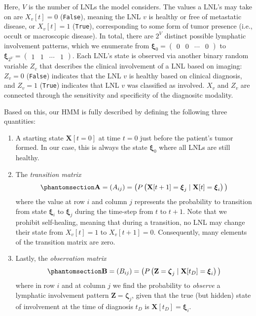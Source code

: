 \documentclass[
  sn-mathphys-num,
]{sn-jnl}
\providecommand{\tightlist}{%
  \setlength{\itemsep}{0pt}\setlength{\parskip}{0pt}}\usepackage{longtable,booktabs,array}
\begin{document}
Here, \(V\) is the number of LNLs the model considers. The values a
LNL's may take on are \(X_v[t] = 0\) (\texttt{False}), meaning the LNL
\(v\) is healthy or free of metastatic disease, or \(X_v[t] = 1\)
(\texttt{True}), corresponding to some form of tumor presence (i.e.,
occult or macroscopic disease). In total, there are \(2^V\) distinct
possible lymphatic involvement patterns, which we enumerate from
\(\boldsymbol{\xi}_0 = \begin{pmatrix} 0 & 0 & \cdots & 0 \end{pmatrix}\)
to
\(\boldsymbol{\xi}_{2^V} = \begin{pmatrix} 1 & 1 & \cdots & 1 \end{pmatrix}\).
Each LNL's state is observed via another binary random variable \(Z_v\)
that describes the clinical involvement of a LNL based on imaging:
\(Z_v = 0\) (\texttt{False}) indicates that the LNL \(v\) is healthy
based on clinical diagnosis, and \(Z_v = 1\) (\texttt{True}) indicates
that LNL \(v\) was classified as involved. \(X_v\) and \(Z_v\) are
connected through the sensitivity and specificity of the diagnositc
modality.

Based on this, our HMM is fully described by defining the following
three quantities:

\begin{enumerate}
\def\labelenumi{\arabic{enumi}.}
\tightlist
\item
  A starting state \(\mathbf{X}[t=0]\) at time \(t=0\) just before the
  patient's tumor formed. In our case, this is always the state
  \(\boldsymbol{\xi}_0\) where all LNLs are still healthy.
\item
  The \emph{transition matrix}
  \begin{equation}\phantomsection\label{eq-trans-matrix}{
  \mathbf{A} = \left( A_{ij} \right) = \big( P \left( \mathbf{X}[t+1] = \boldsymbol{\xi}_j \mid \mathbf{X}[t] = \boldsymbol{\xi}_i \right) \big)
  }\end{equation} where the value at row \(i\) and column \(j\)
  represents the probability to transition from state
  \(\boldsymbol{\xi}_i\) to \(\boldsymbol{\xi}_j\) during the time-step
  from \(t\) to \(t+1\). Note that we prohibit self-healing, meaning
  that during a transition, no LNL may change their state from
  \(X_v[t]=1\) to \(X_v[t+1]=0\). Consequently, many elements of the
  transition matrix are zero.
\item
  Lastly, the \emph{observation matrix}
  \begin{equation}\phantomsection\label{eq-obs-matrix}{
  \mathbf{B} = \left( B_{ij} \right) = \big( P \left( \mathbf{Z} = \boldsymbol{\zeta}_j \mid \mathbf{X}[t_D] = \boldsymbol{\xi}_i \right) \big)
  }\end{equation} where in row \(i\) and at column \(j\) we find the
  probability to \emph{observe} a lymphatic involvement pattern
  \(\mathbf{Z} = \boldsymbol{\zeta}_j\), given that the true (but
  hidden) state of involvement at the time of diagnosis \(t_D\) is
  \(\mathbf{X}[t_D] = \boldsymbol{\xi}_i\).
\end{enumerate}
\end{document}
